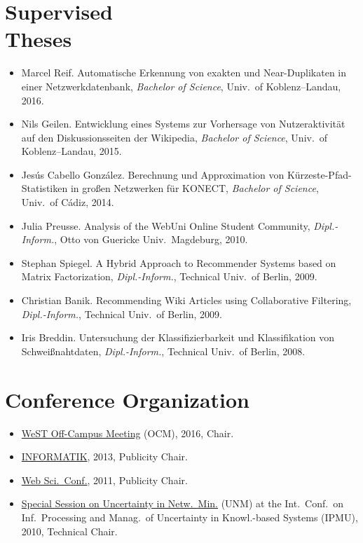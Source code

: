 \documentclass[line,margin]{res}
\newcounter{x}
\begin{document}
\begin{resume}
\section{Supervised \\ Theses}
\begin{itemize}
\item Marcel Reif.  Automatische Erkennung von exakten und
  Near-Duplikaten in einer Netzwerkdatenbank, \emph{Bachelor of
    Science}, Univ.\ of Koblenz--Landau, 2016.
\item Nils Geilen.  Entwicklung eines Systems zur Vorhersage von
  Nutzeraktivität auf den Diskussionsseiten der Wikipedia,
  \emph{Bachelor of Science}, Univ.\ of Koblenz--Landau, 2015.
\item Jesús Cabello González.  Berechnung und Approximation von
  Kürzeste-Pfad-Statistiken in großen Netzwerken für KONECT,
  \emph{Bachelor of Science}, Univ.\ of Cádiz, 2014. 
\item Julia Preusse. Analysis of the WebUni Online Student Community,
  \emph{Dipl.-Inform.}, Otto von Guericke Univ.\ Magdeburg, 2010.  
\item Stephan Spiegel.  A Hybrid Approach to Recommender Systems based
  on Matrix Factorization, \emph{Dipl.-Inform.}, Technical Univ.\ of
  Berlin, 2009.  
\item Christian Banik.  Recommending Wiki Articles using Collaborative
  Filtering, \emph{Dipl.-Inform.}, Technical Univ.\ of Berlin, 2009. 
\item Iris Breddin.  Untersuchung der Klassifizierbarkeit und
  Klassifikation von Schweißnahtdaten, \emph{Dipl.-Inform.}, Technical
  Univ.\ of Berlin, 2008.    
\end{itemize}

\section{Conference Organization}
\begin{itemize}
\item \href{https://sites.google.com/site/ocm2016/}{WeST Off-Campus
  Meeting} (OCM), 2016, Chair. 
\item \href{http://informatik2013.de/}{INFORMATIK}, 2013, Publicity Chair. 
\item \href{http://www.websci11.org/}{Web Sci.\ Conf.}, 2011,
  Publicity Chair.  
\item \href{http://www.dai-labor.de/unm2010/}{Special Session on
  Uncertainty in Netw.\ Min.} (UNM) at the Int.\ Conf.\ on Inf.\ Processing and Manag.\ of Uncertainty in Knowl.-based Systems (IPMU),
  2010, Technical Chair.   
\end{itemize}


\end{resume}
\end{document}

